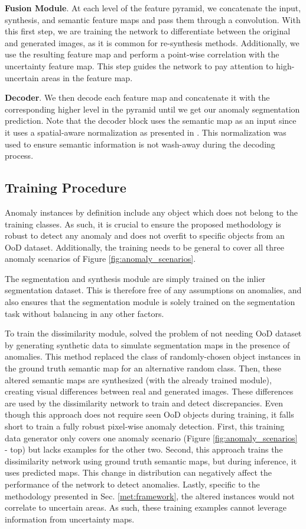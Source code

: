\documentclass[final]{cvpr}
\begin{document}
\textbf{Fusion Module}. At each level of the feature pyramid, we concatenate the input, synthesis, and semantic feature maps and pass them through a  convolution. With this first step, we are training the network to differentiate between the original and generated images, as it is common for re-synthesis methods. Additionally, we use the resulting feature map and perform a point-wise correlation with the uncertainty feature map. This step guides the network to pay attention to high-uncertain areas in the feature map. 

\textbf{Decoder}. We then decode each feature map and concatenate it with the corresponding higher level in the pyramid until we get our anomaly segmentation prediction. Note that the decoder block uses the semantic map as an input since it uses a spatial-aware normalization as presented in \cite{SPADE}. This normalization was used to ensure semantic information is not wash-away during the decoding process.    

\subsection{Training Procedure}
\label{met:training}

Anomaly instances by definition include any object which does not belong to the training classes. As such, it is crucial to ensure the proposed methodology is robust to detect any anomaly and does not overfit to specific objects from an OoD dataset. 
Additionally, the training needs to be general to cover all three anomaly scenarios of Figure \ref{fig:anomaly_scenarios}.

The segmentation and synthesis module are simply trained on the inlier segmentation dataset. This is therefore free of any assumptions on anomalies, and also ensures that the segmentation module is solely trained on the segmentation task without balancing in any other factors.

To train the dissimilarity module, 
\cite{epfl} solved the problem of not needing OoD dataset by generating synthetic data to simulate segmentation maps in the presence of anomalies. This method replaced the class of randomly-chosen object instances in the ground truth semantic map for an alternative random class. Then, these altered semantic maps are synthesized (with the already trained module), creating visual differences between real and generated images. These differences are used by the dissimilarity network to train and detect discrepancies.  
Even though this approach does not require seen OoD objects during training, it falls short to train a fully robust pixel-wise anomaly detection. 
First, this training data generator only covers one anomaly scenario (Figure \ref{fig:anomaly_scenarios} - top) but lacks examples for the other two. 
Second, this approach trains the dissimilarity network using ground truth semantic maps, but during inference, it uses predicted maps. This change in distribution can negatively affect the performance of the network to detect anomalies. 
Lastly, specific to the methodology presented in Sec. \ref{met:framework}, the altered instances would not correlate to uncertain areas. As such, these training examples cannot leverage information from uncertainty maps. 
\end{document}
